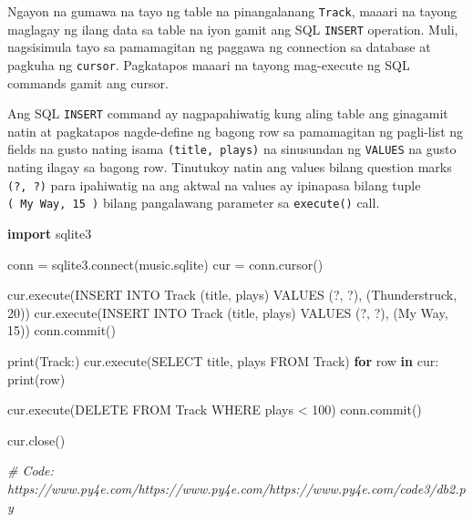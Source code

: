 \documentclass[10pt,]{book}
\newenvironment{Shaded}{}{}
\newcommand{\BuiltInTok}[1]{\textcolor[rgb]{0.00,0.50,0.00}{#1}}
\newcommand{\CommentTok}[1]{\textcolor[rgb]{0.38,0.63,0.69}{\textit{#1}}}
\newcommand{\ControlFlowTok}[1]{\textcolor[rgb]{0.00,0.44,0.13}{\textbf{#1}}}
\newcommand{\DecValTok}[1]{\textcolor[rgb]{0.25,0.63,0.44}{#1}}
\newcommand{\ExtensionTok}[1]{#1}
\newcommand{\ImportTok}[1]{\textcolor[rgb]{0.00,0.50,0.00}{\textbf{#1}}}
\newcommand{\KeywordTok}[1]{\textcolor[rgb]{0.00,0.44,0.13}{\textbf{#1}}}
\newcommand{\NormalTok}[1]{#1}
\newcommand{\OperatorTok}[1]{\textcolor[rgb]{0.40,0.40,0.40}{#1}}
\newcommand{\StringTok}[1]{\textcolor[rgb]{0.25,0.44,0.63}{#1}}
\begin{document}
Ngayon na gumawa na tayo ng table na pinangalanang \texttt{Track},
maaari na tayong maglagay ng ilang data sa table na iyon gamit ang SQL
\texttt{INSERT} operation. Muli, nagsisimula tayo sa pamamagitan ng
paggawa ng connection sa database at pagkuha ng \texttt{cursor}.
Pagkatapos maaari na tayong mag-execute ng SQL commands gamit ang
cursor.

Ang SQL \texttt{INSERT} command ay nagpapahiwatig kung aling table ang
ginagamit natin at pagkatapos nagde-define ng bagong row sa pamamagitan
ng pagli-list ng fields na gusto nating isama \texttt{(title,\ plays)}
na sinusundan ng \texttt{VALUES} na gusto nating ilagay sa bagong row.
Tinutukoy natin ang values bilang question marks \texttt{(?,\ ?)} para
ipahiwatig na ang aktwal na values ay ipinapasa bilang tuple
\texttt{(\ \textquotesingle{}My\ Way\textquotesingle{},\ 15\ )} bilang
pangalawang parameter sa \texttt{execute()} call.

\begin{Shaded}
\begin{Highlighting}[]
\ImportTok{import}\NormalTok{ sqlite3}

\NormalTok{conn }\OperatorTok{=}\NormalTok{ sqlite3.}\ExtensionTok{connect}\NormalTok{(}\StringTok{\textquotesingle{}music.sqlite\textquotesingle{}}\NormalTok{)}
\NormalTok{cur }\OperatorTok{=}\NormalTok{ conn.cursor()}

\NormalTok{cur.execute(}\StringTok{\textquotesingle{}INSERT INTO Track (title, plays) VALUES (?, ?)\textquotesingle{}}\NormalTok{,}
\NormalTok{    (}\StringTok{\textquotesingle{}Thunderstruck\textquotesingle{}}\NormalTok{, }\DecValTok{20}\NormalTok{))}
\NormalTok{cur.execute(}\StringTok{\textquotesingle{}INSERT INTO Track (title, plays) VALUES (?, ?)\textquotesingle{}}\NormalTok{,}
\NormalTok{    (}\StringTok{\textquotesingle{}My Way\textquotesingle{}}\NormalTok{, }\DecValTok{15}\NormalTok{))}
\NormalTok{conn.commit()}

\BuiltInTok{print}\NormalTok{(}\StringTok{\textquotesingle{}Track:\textquotesingle{}}\NormalTok{)}
\NormalTok{cur.execute(}\StringTok{\textquotesingle{}SELECT title, plays FROM Track\textquotesingle{}}\NormalTok{)}
\ControlFlowTok{for}\NormalTok{ row }\KeywordTok{in}\NormalTok{ cur:}
     \BuiltInTok{print}\NormalTok{(row)}

\NormalTok{cur.execute(}\StringTok{\textquotesingle{}DELETE FROM Track WHERE plays \textless{} 100\textquotesingle{}}\NormalTok{)}
\NormalTok{conn.commit()}

\NormalTok{cur.close()}

\CommentTok{\# Code: https://www.py4e.com/https://www.py4e.com/https://www.py4e.com/code3/db2.py}
\end{Highlighting}
\end{Shaded}
\end{document}
